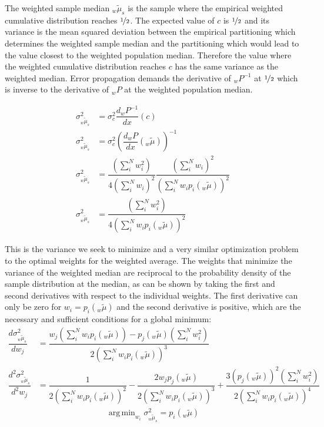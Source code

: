 \documentclass[ejs]{imsart}
\DeclareMathOperator*{\argmin}{arg\,min}
\numberwithin{equation}{section}
\theoremstyle{plain}
\begin{document}
\noindent The weighted sample median ${_w\tilde{\mu}_s}$ is the sample where the empirical weighted cumulative distribution reaches $\nicefrac{1}{2}$.
The expected value of $c$ is $\nicefrac{1}{2}$ and its variance is the mean squared deviation between the empirical partitioning which determines the weighted sample median and the partitioning which would lead to the value closest to the weighted population median.
Therefore the value where the weighted cumulative distribution reaches $c$ has the same variance as the weighted median.
Error propagation demands the derivative of ${_wP^{-1}}$ at $\nicefrac{1}{2}$ which is inverse to the derivative of ${_wP}$ at the weighted population median.

\begin{align*}
\sigma^2_{_w\tilde{\mu}_s} &= \sigma^2_c \dfrac{d{_wP^{-1}}}{dx} \left(c\right)\\
\sigma^2_{_w\tilde{\mu}_s} &= \sigma^2_c \left(\dfrac{d{_wP}}{dx} \left({_w\tilde{\mu}}\right)\right)^{-1}\\
\sigma^2_{_w\tilde{\mu}_s} &= \dfrac{\left(\sum_i^N w_i^2\right)}{4 \left( \sum_i^N  w_i \right)^2} \dfrac{\left( \sum_i^N  w_i \right)^2}{\left( \sum_i^N  w_i p_i\left({_w\tilde{\mu}}\right)\right)^2} \\
\sigma^2_{_w\tilde{\mu}_s} &= \dfrac{\left(\sum_i^N w_i^2\right)}{4 \left( \sum_i^N  w_i p_i\left({_w\tilde{\mu}}\right)\right)^2}
\end{align*}

\noindent This is the variance we seek to minimize and a very similar optimization problem to the optimal weights for the weighted average.
The weights that minimize the variance of the weighted median are reciprocal to the probability density of the sample distribution at the median, as can be shown by taking the first and second derivatives with respect to the individual weights.
The first derivative can only be zero for $w_i = p_i\left({_w\tilde{\mu}}\right)$ and the second derivative is positive, which are the necessary and sufficient conditions for a global minimum:
\begin{align*}
\dfrac{d \sigma^2_{_w\tilde{\mu}_s}}{d w_j} &= \dfrac{ w_j \left( \sum_i^N  w_i p_i\left({_w\tilde{\mu}}\right)\right) - p_j\left({_w\tilde{\mu}}\right) \left(\sum_i^N w_i^2\right)}{2 \left( \sum_i^N  w_i p_i\left({_w\tilde{\mu}}\right)\right)^3} \\%
\dfrac{d^2 \sigma^2_{_w\tilde{\mu}_s}}{d^2 w_j} &= \dfrac{1}{2 \left( \sum_i^N  w_i p_i\left({_w\tilde{\mu}}\right)\right)^2} - \dfrac{2 w_j p_j\left({_w\tilde{\mu}}\right)}{2 \left( \sum_i^N  w_i p_i\left({_w\tilde{\mu}}\right)\right)^3} + \dfrac{3 \left( p_j\left({_w\tilde{\mu}}\right)\right)^2 \left(\sum_i^N w_i^2\right)}{2 \left( \sum_i^N  w_i p_i\left({_w\tilde{\mu}}\right)\right)^4} %
\end{align*}
\begin{align}
\argmin_{w_i} \sigma^2_{_w\tilde{\mu}_s} = p_i\left({_w\tilde{\mu}}\right) \label{optimal_median_weights}
\end{align}
\end{document}
